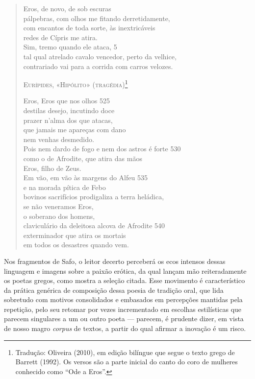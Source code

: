 \begin{quote}
\smallskip

Eros, de novo, de sob escuras\\
pálpebras, com olhos me fitando derretidamente,\\ %
com encantos de toda sorte, às inextricáveis\\
redes de Cípris me atira.\\ %
Sim, tremo quando ele ataca, \num{5}\\
tal qual atrelado cavalo vencedor, perto da velhice,\\
contrariado vai para a corrida com carros velozes.

\bigskip

{\centering
\textsc{Eurípides, «Hipólito» (tragédia)}\footnote{ Tradução: Oliveira (2010), em
edição bilíngue que segue o texto grego de Barrett (1992). Os versos são a parte inicial do canto do coro de mulheres conhecido como ``Ode a Eros''.}
\par}

\smallskip

Eros, Eros que nos olhos \num{525}\\
destilas desejo, incutindo doce\\ 
prazer n’alma dos que atacas,\\
que jamais me apareças com dano\\
nem venhas desmedido.\\
Pois nem dardo de fogo e nem dos astros é forte \num{530}\\
como o de Afrodite, que atira das mãos\\
Eros, filho de Zeus.\\
Em vão, em vão às margens do Alfeu \num{535}\\[5pt]
e na morada pítica de Febo\\
bovinos sacrifícios prodigaliza a terra heládica,\\
se não veneramos Eros,\\
o soberano dos homens,\\
claviculário da deleitosa alcova de Afrodite \num{540}\\
exterminador que atira os mortais\\
em todos os desastres quando vem.
\end{quote}

Nos fragmentos de Safo, o leitor decerto perceberá os ecos intensos
dessas linguagem e imagens sobre a paixão erótica, da qual lançam mão
reiteradamente os poetas gregos, como mostra a seleção citada. Esse movimento é
característico da prática genérica de composição dessa poesia de tradição oral, que lida sobretudo com motivos consolidados e embasados em
percepções mantidas pela repetição, pelo seu retomar por vezes incrementado em
escolhas estilísticas que parecem singulares a um ou outro poeta --- parecem, é
prudente dizer, em vista de nosso magro \textit{corpus} de textos, a partir do
qual afirmar a inovação é um risco.

